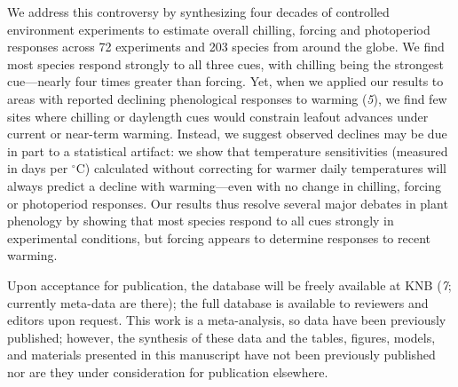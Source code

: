 \documentclass[10.5pt,a4paper]{letter}
\begin{document}
\begin{letter}{}
\par We address this controversy by synthesizing four decades of controlled environment experiments to estimate overall chilling, forcing and photoperiod responses across 72 experiments and 203 species from around the globe. We find most species respond strongly to all three cues, with chilling being the strongest cue---nearly four times greater than forcing. Yet, when we applied our results to areas with reported declining phenological responses to warming (\emph{5}), we find few sites where chilling or daylength cues would constrain leafout advances under current or near-term warming. Instead, we suggest observed declines may be due in part to a statistical artifact: we show that temperature sensitivities (measured in days per $^{\circ}$C) calculated without correcting for warmer daily temperatures will always predict a decline with warming---even with no change in chilling, forcing or photoperiod responses. %
Our results thus resolve several major debates in plant phenology by showing that most species respond to all cues strongly in experimental conditions, but forcing appears to determine responses to recent warming. %

\par Upon acceptance for publication, the database will be freely available at KNB (\emph{7}; currently meta-data are there); the full database is available to reviewers and editors upon request. This work is a meta-analysis, so data have been previously published; however, the synthesis of these data and the tables, figures, models, and materials presented in this manuscript have not been previously published nor are they under consideration for publication elsewhere.


\end{letter}
\end{document}
